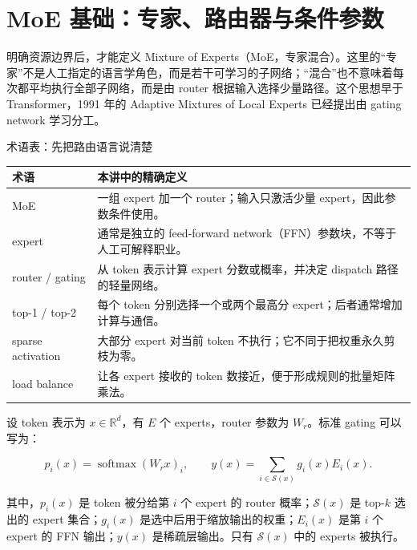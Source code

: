 \section{MoE 基础：专家、路由器与条件参数}

明确资源边界后，才能定义 Mixture of Experts（MoE，专家混合）。这里的“专家”不是人工指定的语言学角色，而是若干可学习的子网络；“混合”也不意味着每次都平均执行全部子网络，而是由 router 根据输入选择少量路径。这个思想早于 Transformer，1991 年的 Adaptive Mixtures of Local Experts 已经提出由 gating network 学习分工。


\begin{knowledgebox}{术语表：先把路由语言说清楚}
\begin{tabularx}{\textwidth}{L{0.22\textwidth}X}
\toprule
术语 & 本讲中的精确定义 \\
\midrule
MoE & 一组 expert 加一个 router；输入只激活少量 expert，因此参数条件使用。 \\
expert & 通常是独立的 feed-forward network（FFN）参数块，不等于人工可解释职业。 \\
router / gating & 从 token 表示计算 expert 分数或概率，并决定 dispatch 路径的轻量网络。 \\
top-1 / top-2 & 每个 token 分别选择一个或两个最高分 expert；后者通常增加计算与通信。 \\
sparse activation & 大部分 expert 对当前 token 不执行；它不同于把权重永久剪枝为零。 \\
load balance & 让各 expert 接收的 token 数接近，便于形成规则的批量矩阵乘法。 \\
\bottomrule
\end{tabularx}
\end{knowledgebox}

设 token 表示为 $x\in\mathbb{R}^{d}$，有 $E$ 个 experts，router 参数为 $W_r$。标准 gating 可以写为：

\[
p_i(x)=\operatorname{softmax}(W_rx)_i,
\qquad
y(x)=\sum_{i\in\mathcal{S}(x)} g_i(x)E_i(x).
\]

其中，$p_i(x)$ 是 token 被分给第 $i$ 个 expert 的 router 概率；$\mathcal{S}(x)$ 是 top-$k$ 选出的 expert 集合；$g_i(x)$ 是选中后用于缩放输出的权重；$E_i(x)$ 是第 $i$ 个 expert 的 FFN 输出；$y(x)$ 是稀疏层输出。只有 $\mathcal{S}(x)$ 中的 experts 被执行。


